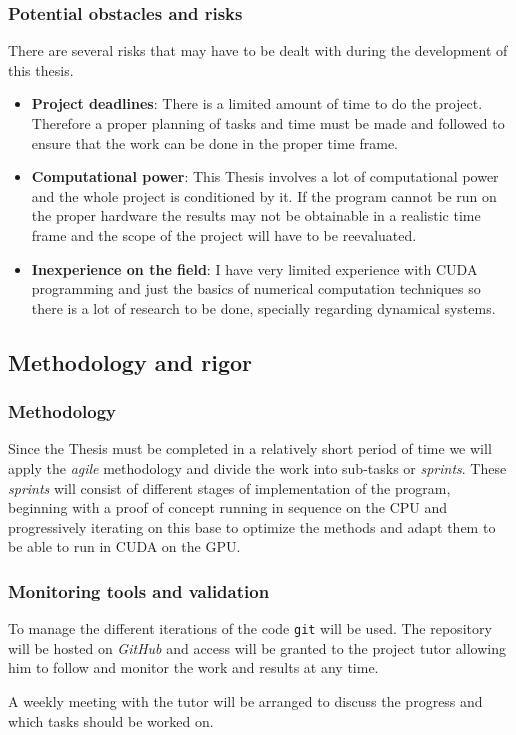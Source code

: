 \subsubsection{Potential obstacles and risks}

There are several risks that may have to be dealt with during the development of this thesis.

\begin{itemize}
    \item \textbf{Project deadlines}: There is a limited amount of time to do the project. Therefore a proper planning of tasks and time must be made and followed to ensure that the work can be done in the proper time frame.
    \item \textbf{Computational power}: This Thesis involves a lot of computational power and the whole project is conditioned by it. If the program cannot be run on the proper hardware the results may not be obtainable in a realistic time frame and the scope of the project will have to be reevaluated.
    \item \textbf{Inexperience on the field}: I have very limited experience with CUDA programming and just the basics of numerical computation techniques so there is a lot of research to be done, specially regarding      dynamical systems.
\end{itemize}

\subsection{Methodology and rigor}

\subsubsection{Methodology}

Since the Thesis must be completed in a relatively short period of time we will apply the \emph{agile} methodology and divide the work into sub-tasks or \emph{sprints}. These \emph{sprints} will consist of different stages of  implementation of the program, beginning with a proof of concept running in sequence on the CPU and progressively iterating on this base to optimize the methods and adapt them to be able to run in CUDA on the GPU.

\subsubsection{Monitoring tools and validation}

To manage the different iterations of the code \texttt{git} will be used. The repository will be hosted on \emph{GitHub} and access will be granted to the project tutor allowing him to follow and monitor the work and results at any time.

A weekly meeting with the tutor will be arranged to discuss the progress and which tasks should be worked on.
